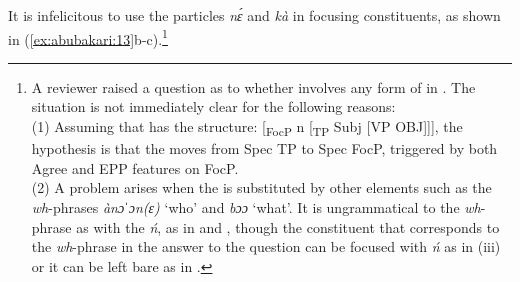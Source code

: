 \documentclass[output=paper,modfonts,nonflat,
 hidelinks
]{langsci/langscibook}
\begin{document}
\newpage 
 It is infelicitous to use the particles \textit{nɛ́} and \textit{kà} in focusing  constituents, as shown in (\ref{ex:abubakari:13}b-c).\footnote{A 
    reviewer raised a question as to whether   involves any form of  in . The situation is not immediately clear for the following reasons: \\
    (1) Assuming that   has the structure: [\textsubscript{FocP} n [\textsubscript{TP} Subj [VP OBJ]]], the hypothesis is that the  moves from Spec TP to Spec FocP, triggered by both Agree and EPP features on FocP. \\
    (2) A problem arises when the  is substituted by other elements such as the \textit{wh}-phrases \textit{ànɔˈ}\textit{ɔn(ɛ)} ‘who’ and \textit{bɔɔ} ‘what’. It is ungrammatical to  the \textit{wh}-phrase as  with the   \textit{ń}, as in  and , though the constituent that corresponds to the \textit{wh}-phrase in the answer to the question can be focused with \textit{ń} as in (iii) or it can be left bare as in .\vspace*{-2mm}
    
}
\end{document}
